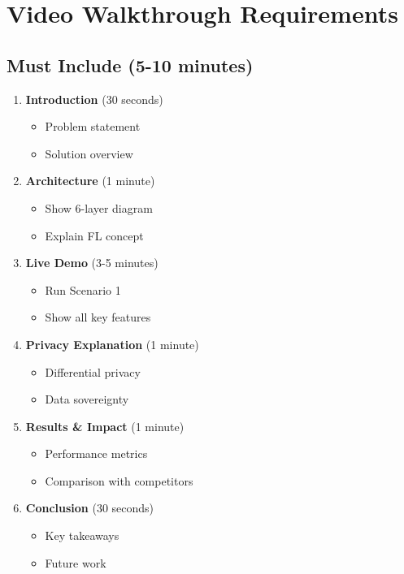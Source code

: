 \documentclass[11pt,a4paper]{article}
\begin{document}
\section{Video Walkthrough Requirements}

\subsection{Must Include (5-10 minutes)}

\begin{enumerate}[leftmargin=*]
    \item \textbf{Introduction} (30 seconds)
    \begin{itemize}
        \item Problem statement
        \item Solution overview
    \end{itemize}
    
    \item \textbf{Architecture} (1 minute)
    \begin{itemize}
        \item Show 6-layer diagram
        \item Explain FL concept
    \end{itemize}
    
    \item \textbf{Live Demo} (3-5 minutes)
    \begin{itemize}
        \item Run Scenario 1
        \item Show all key features
    \end{itemize}
    
    \item \textbf{Privacy Explanation} (1 minute)
    \begin{itemize}
        \item Differential privacy
        \item Data sovereignty
    \end{itemize}
    
    \item \textbf{Results \& Impact} (1 minute)
    \begin{itemize}
        \item Performance metrics
        \item Comparison with competitors
    \end{itemize}
    
    \item \textbf{Conclusion} (30 seconds)
    \begin{itemize}
        \item Key takeaways
        \item Future work
    \end{itemize}
\end{enumerate}
\end{document}
